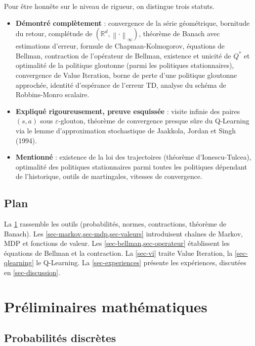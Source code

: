 \documentclass[11pt,a4paper]{article}
\theoremstyle{plain}
\theoremstyle{definition}
\theoremstyle{remark}
\newcommand{\R}{\mathbb{R}}
\newcommand{\ninf}[1]{\left\lVert #1 \right\rVert_\infty}
\newcommand{\1}{\mathbf{1}}
\begin{document}
Pour être honnête sur le niveau de rigueur, on distingue trois statuts.
\begin{itemize}
\item \textbf{Démontré complètement} : convergence de la série géométrique, bornitude du retour, complétude de $(\R^d,\ninf{\cdot})$, théorème de Banach avec estimations d'erreur, formule de Chapman-Kolmogorov, équations de Bellman, contraction de l'opérateur de Bellman, existence et unicité de $Q^*$ et optimalité de la politique gloutonne (parmi les politiques stationnaires), convergence de Value Iteration, borne de perte d'une politique gloutonne approchée, identité d'espérance de l'erreur TD, analyse du schéma de Robbins-Monro scalaire.
\item \textbf{Expliqué rigoureusement, preuve esquissée} : visite infinie des paires $(s,a)$ sous $\varepsilon$-glouton, théorème de convergence presque sûre du Q-Learning via le lemme d'approximation stochastique de Jaakkola, Jordan et Singh (1994).
\item \textbf{Mentionné} : existence de la loi des trajectoires (théorème d'Ionescu-Tulcea), optimalité des politiques stationnaires parmi toutes les politiques dépendant de l'historique, outils de martingales, vitesses de convergence.
\end{itemize}

\subsection{Plan}

La \cref{sec-prelim} rassemble les outils (probabilités, normes, contractions, théorème de Banach). Les \cref{sec-markov,sec-mdp,sec-valeurs} introduisent chaînes de Markov, MDP et fonctions de valeur. Les \cref{sec-bellman,sec-operateur} établissent les équations de Bellman et la contraction. La \cref{sec-vi} traite Value Iteration, la \cref{sec-qlearning} le Q-Learning. La \cref{sec-experiences} présente les expériences, discutées en \cref{sec-discussion}.

\section{Préliminaires mathématiques}\label{sec-prelim}

\subsection{Probabilités discrètes}
\end{document}
